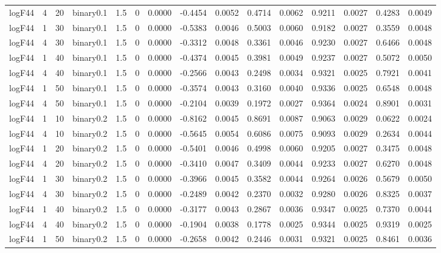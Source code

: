 \begin{longtable}{rrrrrrrrrrrrrrr}
  logF44 & 4 & 20 & binary0.1 & 1.5 & 0 & 0.0000 & -0.4454 & 0.0052 & 0.4714 & 0.0062 & 0.9211 & 0.0027 & 0.4283 & 0.0049 \\ 
  logF44 & 1 & 30 & binary0.1 & 1.5 & 0 & 0.0000 & -0.5383 & 0.0046 & 0.5003 & 0.0060 & 0.9182 & 0.0027 & 0.3559 & 0.0048 \\ 
  logF44 & 4 & 30 & binary0.1 & 1.5 & 0 & 0.0000 & -0.3312 & 0.0048 & 0.3361 & 0.0046 & 0.9230 & 0.0027 & 0.6466 & 0.0048 \\ 
  logF44 & 1 & 40 & binary0.1 & 1.5 & 0 & 0.0000 & -0.4374 & 0.0045 & 0.3981 & 0.0049 & 0.9237 & 0.0027 & 0.5072 & 0.0050 \\ 
  logF44 & 4 & 40 & binary0.1 & 1.5 & 0 & 0.0000 & -0.2566 & 0.0043 & 0.2498 & 0.0034 & 0.9321 & 0.0025 & 0.7921 & 0.0041 \\ 
  logF44 & 1 & 50 & binary0.1 & 1.5 & 0 & 0.0000 & -0.3574 & 0.0043 & 0.3160 & 0.0040 & 0.9336 & 0.0025 & 0.6548 & 0.0048 \\ 
  logF44 & 4 & 50 & binary0.1 & 1.5 & 0 & 0.0000 & -0.2104 & 0.0039 & 0.1972 & 0.0027 & 0.9364 & 0.0024 & 0.8901 & 0.0031 \\ 
  logF44 & 1 & 10 & binary0.2 & 1.5 & 0 & 0.0000 & -0.8162 & 0.0045 & 0.8691 & 0.0087 & 0.9063 & 0.0029 & 0.0622 & 0.0024 \\ 
  logF44 & 4 & 10 & binary0.2 & 1.5 & 0 & 0.0000 & -0.5645 & 0.0054 & 0.6086 & 0.0075 & 0.9093 & 0.0029 & 0.2634 & 0.0044 \\ 
  logF44 & 1 & 20 & binary0.2 & 1.5 & 0 & 0.0000 & -0.5401 & 0.0046 & 0.4998 & 0.0060 & 0.9205 & 0.0027 & 0.3475 & 0.0048 \\ 
  logF44 & 4 & 20 & binary0.2 & 1.5 & 0 & 0.0000 & -0.3410 & 0.0047 & 0.3409 & 0.0044 & 0.9233 & 0.0027 & 0.6270 & 0.0048 \\ 
  logF44 & 1 & 30 & binary0.2 & 1.5 & 0 & 0.0000 & -0.3966 & 0.0045 & 0.3582 & 0.0044 & 0.9264 & 0.0026 & 0.5679 & 0.0050 \\ 
  logF44 & 4 & 30 & binary0.2 & 1.5 & 0 & 0.0000 & -0.2489 & 0.0042 & 0.2370 & 0.0032 & 0.9280 & 0.0026 & 0.8325 & 0.0037 \\ 
  logF44 & 1 & 40 & binary0.2 & 1.5 & 0 & 0.0000 & -0.3177 & 0.0043 & 0.2867 & 0.0036 & 0.9347 & 0.0025 & 0.7370 & 0.0044 \\ 
  logF44 & 4 & 40 & binary0.2 & 1.5 & 0 & 0.0000 & -0.1904 & 0.0038 & 0.1778 & 0.0025 & 0.9344 & 0.0025 & 0.9319 & 0.0025 \\ 
  logF44 & 1 & 50 & binary0.2 & 1.5 & 0 & 0.0000 & -0.2658 & 0.0042 & 0.2446 & 0.0031 & 0.9321 & 0.0025 & 0.8461 & 0.0036 \\ 

\end{longtable}
